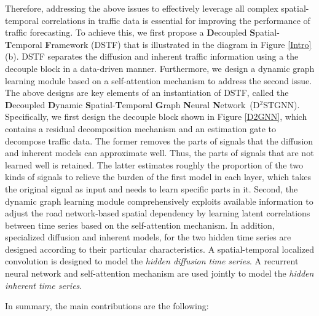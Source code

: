 \documentclass[sigconf, nonacm]{acmart}
\begin{document}
{Therefore, addressing the above issues to effectively leverage all complex spatial-temporal correlations in traffic data is essential for improving the performance of traffic forecasting. 
To achieve this, we first propose a \textbf{D}ecoupled \textbf{S}patial-\textbf{T}emporal \textbf{F}ramework (DSTF) that is illustrated in the diagram in Figure \ref{Intro}(b).
DSTF separates the diffusion and inherent traffic information using a the decouple block in a data-driven manner.
Furthermore, we design a dynamic graph learning module based on a self-attention mechanism to address the second issue.
The above designs are key elements of an instantiation of DSTF, called the \textbf{D}ecoupled \textbf{D}ynamic \textbf{S}patial-\textbf{T}emporal \textbf{G}raph \textbf{N}eural \textbf{N}etwork~(D$^2$STGNN).
Specifically, we first design the decouple block shown in Figure \ref{D2GNN}, which contains a residual decomposition mechanism and an estimation gate to decompose traffic data. 
The former removes the parts of signals that the diffusion and inherent models can approximate well. Thus, the parts of signals that are not learned well is retained. 
The latter estimates roughly the proportion of the two kinds of signals to relieve the burden of the first model in each layer, which takes the original signal as input and needs to learn specific parts in it.
Second, the dynamic graph learning module comprehensively exploits available information to adjust the road network-based spatial dependency by learning latent correlations between time series based on the self-attention mechanism.
In addition, specialized diffusion and inherent models, for the two hidden time series are designed according to their particular characteristics.
A spatial-temporal localized convolution is designed to model the \textit{hidden diffusion time series}.
A recurrent neural network and self-attention mechanism are used jointly to model the \textit{hidden inherent time series}.}

In summary, the main contributions are the following:
\end{document}
